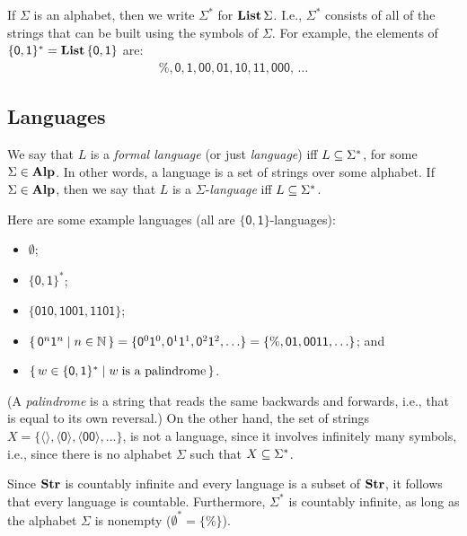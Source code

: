 If $\Sigma$ is an alphabet, then we write $\Sigma^*$
%
%
for $\mathbf{List}\,\Sigma$.
I.e., $\Sigma^*$ consists of all of the strings that can be built
using the symbols of $\Sigma$.
For example, the elements of $\mathsf{\{0,1\}^*} = \mathbf{List}\,\mathsf{\{0,1\}}$ are:
\begin{gather*}
\%, \mathsf{0}, \mathsf{1}, \mathsf{00}, \mathsf{01}, \mathsf{10},
\mathsf{11},\mathsf{000},\, \ldots
\end{gather*}
%

\subsection{Languages}

%
We say that $L$ is a \emph{formal language}
%
(or just \emph{language}) iff $L\subseteq\Sigma^*$, for some
$\Sigma\in\mathbf{Alp}$.  In other words, a language is a set of strings over
some alphabet.
If $\Sigma\in\mathbf{Alp}$, then we say that $L$ is a
$\Sigma$-\emph{language}
%
%
iff $L\subseteq\Sigma^*$.

Here are some example languages (all are $\mathsf{\{0,1\}}$-languages):
\begin{itemize}
\item $\emptyset$;

\item $\mathsf{\{0,1\}^*}$;

\item $\mathsf{\{010,1001,1101\}}$;

\item $\{ \, \mathsf{0}^n\mathsf{1}^n \mid n\in\mathbb{N} \, \} =
\{\mathsf{0}^0\mathsf{1}^0, \mathsf{0}^1\mathsf{1}^1, \mathsf{0}^2\mathsf{1}^2, \ldots\} =
\mathsf{\{\%, 01, 0011, \ldots\}}$; and

\item $\{ \, w\in\mathsf{\{0,1\}^*} \mid w\;\allowbreak\mbox{is a palindrome}\allowbreak \, \}$.
\end{itemize}
(A \emph{palindrome}
%
%
is a string that reads the same backwards and forwards,
i.e., that is equal to its own reversal.)
On the other hand, the set of strings
$X=\mathsf{\{\langle\rangle, \langle 0\rangle, \langle 00\rangle}, \ldots\}$,
is not a language, since it involves infinitely many symbols, i.e.,
since there is no alphabet $\Sigma$ such that $X\subseteq\Sigma^*$.

Since $\mathbf{Str}$ is countably infinite and every language is a subset
of $\mathbf{Str}$, it follows that every language is countable.
%
Furthermore, $\Sigma^*$ is countably infinite,
%
as long as the alphabet
$\Sigma$ is nonempty ($\emptyset^*=\{\%\}$).

